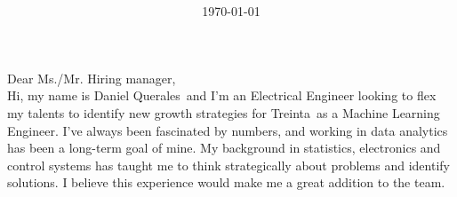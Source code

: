 \documentclass[5pt]{article} %
\title{{\Huge \myname} \\ %
{\large \position}} %
\date{\today}
\def\myname{Daniel Querales}
\def\position{Machine Learning Engineer}
\def\company{Treinta}
\def\managername{Hiring manager}
\def\managertitle{Hiring manager’s title}
\def\companyaddress{Company address}
\begin{document}
\maketitle

\thispagestyle{empty}


Dear Ms./Mr. \managername, \\

Hi, my name is \myname~and I’m an Electrical Engineer looking to flex my talents to identify new growth strategies for \company~as a \position. I’ve always been fascinated by numbers, and working in data analytics has been a long-term goal of mine. My background in statistics, electronics and control systems has taught me to think strategically about problems and identify solutions. I believe this experience would make me a great addition to the team.  
\bigskip

\end{document}
